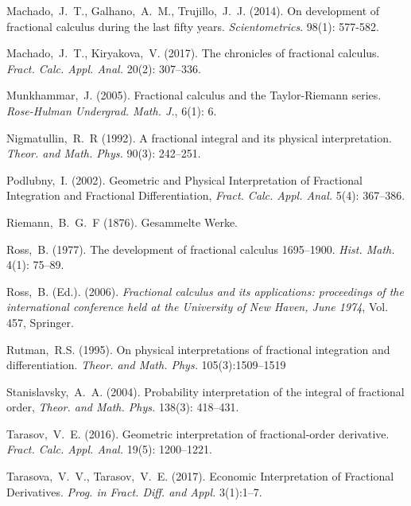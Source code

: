 \documentclass{article}
\theoremstyle{theorem}
\theoremstyle{definition}
\begin{document}
\begin{thebibliography}{1}
 Machado,~J.~T., Galhano,~A.~M., Trujillo,~J.~J. (2014). On development of fractional calculus during the last fifty years. \textit{Scientometrics}. 98(1): 577-582.

 Machado,~J.~T., Kiryakova,~V. (2017). The chronicles of fractional calculus. \textit{Fract. Calc. Appl. Anal.} 20(2): 307--336.

 Munkhammar,~J. (2005). Fractional calculus and the Taylor-Riemann series. \textit{Rose-Hulman Undergrad. Math. J.}, 6(1): 6.

 Nigmatullin,~R.~R (1992). A fractional integral and its physical interpretation. \textit{Theor. and Math. Phys.} 90(3): 242--251.

 Podlubny,~I. (2002). Geometric and Physical Interpretation of Fractional Integration and Fractional Differentiation, \textit{Fract. Calc. Appl. Anal.} 5(4): 367--386.

 Riemann,~B.~G.~F (1876). Gesammelte Werke.

 Ross,~B. (1977). The development of fractional calculus 1695--1900. \textit{Hist. Math.} 4(1): 75--89.

 Ross,~B. (Ed.). (2006). \textit{Fractional calculus and its applications: proceedings of the international conference held at the University of New Haven, June 1974}, Vol. 457, Springer.
 
 Rutman,~R.S. (1995). On physical interpretations of fractional integration and differentiation. \textit{Theor. and Math. Phys.} 105(3):1509--1519

 Stanislavsky,~A.~A. (2004).  Probability interpretation of the integral of fractional order, \textit{Theor. and Math. Phys.} 138(3): 418--431.

 Tarasov,~V.~E. (2016). Geometric interpretation of fractional-order derivative. \textit{Fract. Calc. Appl. Anal.} 19(5): 1200--1221.

 Tarasova,~V.~V., Tarasov,~V.~E. (2017). Economic Interpretation of Fractional Derivatives. \textit{Prog. in Fract. Diff. and Appl.} 3(1):1--7. 

\end{thebibliography}
\vfill\eject
\end{document}
